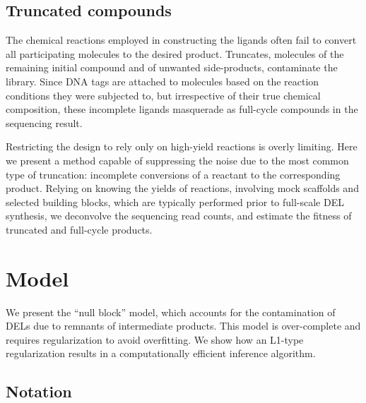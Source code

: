\documentclass[letter,10pt,oneside]{article}
\newcommand{\+}{^\dagger}
\begin{document}
\subsection{Truncated compounds}

The chemical reactions employed in constructing the ligands often fail to convert all participating molecules to the desired product. Truncates, molecules of the remaining initial compound and of unwanted side-products, contaminate the library. Since DNA tags are attached to molecules based on the reaction conditions they were subjected to, but irrespective of their true chemical composition, these incomplete ligands masquerade as full-cycle compounds in the sequencing result.

Restricting the design to rely only on high-yield reactions is overly limiting. Here we present a method capable of suppressing the noise due to the most common type of truncation: incomplete conversions of a reactant to the corresponding product. Relying on knowing the yields of reactions, involving mock scaffolds and selected building blocks, which are typically performed prior to full-scale DEL synthesis, we deconvolve the sequencing read counts, and estimate the fitness of truncated and full-cycle products.


\section{Model}

We present the ``null block'' model, which accounts for the contamination of DELs due to remnants of intermediate products. This model is over-complete and requires regularization to avoid overfitting. We show how an L1-type regularization results in a computationally efficient inference algorithm.

\subsection{Notation}
\end{document}
